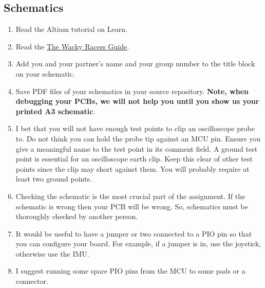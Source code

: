 \documentclass[11pt, a4paper]{article}
\newcommand{\theguide}{\href{https://eng-git.canterbury.ac.nz/wacky-racers/wacky-racers/-/blob/master/doc/guide/guide.pdf}{The Wacky Racers Guide}}
\begin{document}
\subsection{Schematics}

\begin{enumerate}
\item Read the Altium tutorial on Learn.

\item Read the \theguide.

\item Add you and your partner's name and your group number to the
  title block on your schematic.

\item Save PDF files of your schematics in your source repository.
  \textbf{Note, when debugging your PCBs, we will not help you until
    you show us your printed A3 schematic}.

\item I bet that you will not have enough test points to clip an oscilloscope
  probe to.  Do not think you can hold the probe tip against an MCU pin.  Ensure
  you give a meaningful name to the test point in its comment field.  A ground
  test point is essential for an oscilloscope earth clip.  Keep this clear of
  other test points since the clip may short against them.  You will probably
  require at least two ground points.

\item Checking the schematic is the most crucial part of the
  assignment.  If the schematic is wrong then your PCB will be wrong.
  So, schematics must be thoroughly checked by another person.




\item It would be useful to have a jumper or two connected to a PIO
  pin so that you can configure your board.  For example, if a jumper
  is in, use the joystick, otherwise use the IMU.

\item I suggest running some spare PIO pins from the MCU to some pads
  or a connector.

\end{enumerate}
\end{document}
